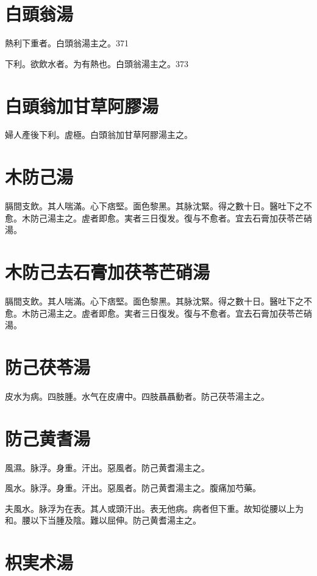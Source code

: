 \section{白頭翁湯}

熱利下重者。白頭翁湯主之。371

下利。欲飲水者。为有熱也。白頭翁湯主之。373

\section{白頭翁加甘草阿膠湯}

{\khaaitp 婦人}產後下利。虗極。白頭翁加甘草阿膠湯主之。

\section{木防己湯}

膈間支飲。其人喘滿。心下痞堅。面色黎黑。其脉沈緊。得之數十日。醫吐下之不愈。木防己湯主之。虗者即愈。実者三日復发。復与不愈者。宜去石膏加茯苓芒硝湯。

\section{木防己去石膏加茯苓芒硝湯}

膈間支飲。其人喘滿。心下痞堅。面色黎黑。其脉沈緊。得之數十日。醫吐下之不愈。木防己湯主之。虗者即愈。実者三日復发。復与不愈者。宜去石膏加茯苓芒硝湯。

\section{防己茯苓湯}

皮水为病。四肢腫。水气在皮膚中。四肢聶聶動者。防己茯苓湯主之。

\section{防己黄耆湯}

風濕。脉浮。身重。汗出。惡風者。防己黄耆湯主之。

風水。脉浮。身重。汗出。惡風者。防己黄耆湯主之。腹痛加芍藥。

夫風水。脉浮为在表。其人或頭汗出。表无他病。病者但下重。故知從腰以上为和。腰以下当腫及陰。難以屈伸。防己黄耆湯主之。

\section{枳実术湯}


